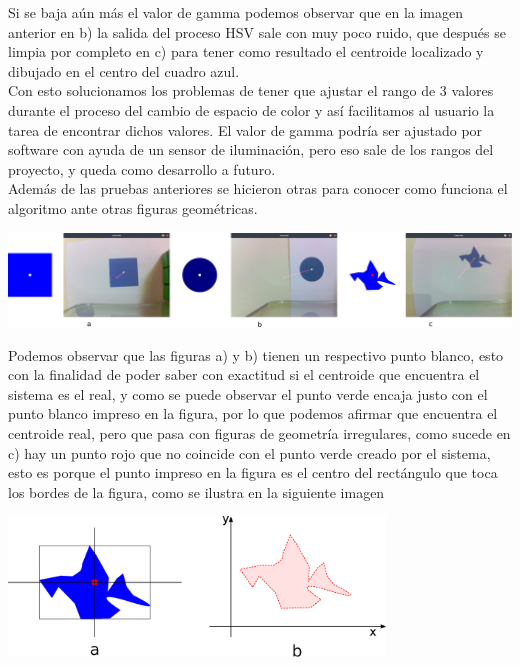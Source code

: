 Si se baja aún más el valor de gamma podemos observar que en la imagen anterior en b) la salida del proceso HSV sale con muy
poco ruido, que después se limpia por completo en c) para tener como resultado el centroide localizado y dibujado en el
centro del cuadro azul.\\
Con esto solucionamos los problemas de tener que ajustar el rango de 3 valores durante el proceso del cambio de espacio de color
y así facilitamos al usuario la tarea de encontrar dichos valores. El valor de gamma podría ser ajustado por software con
ayuda de un sensor de iluminación, pero eso sale de los rangos del proyecto, y queda como desarrollo a futuro.\\
Además de las pruebas anteriores se hicieron otras para conocer como funciona el algoritmo ante otras figuras geométricas.
\begin{center}
	\includegraphics[width=1.0\textwidth]{Contenido/Cuerpo/Capitulo4/Fig28.eps}
	\label{Fig9}
\end{center}
Podemos observar que las figuras a) y b) tienen un respectivo punto blanco, esto con la finalidad de poder saber con exactitud si
el centroide que encuentra el sistema es el real, y como se puede observar el punto verde encaja justo con el punto blanco
impreso en la figura, por lo que podemos afirmar que encuentra el centroide real, pero que pasa con figuras de geometría irregulares,
como sucede en c) hay un punto rojo que no coincide con el punto verde creado por el sistema, esto es porque el punto impreso
en la figura es el centro del rectángulo que toca los bordes de la figura, como se ilustra en la siguiente imagen
\begin{center}
	\includegraphics[width=0.75\textwidth]{Contenido/Cuerpo/Capitulo4/Fig29.eps}
	\label{Fig9}
\end{center}
